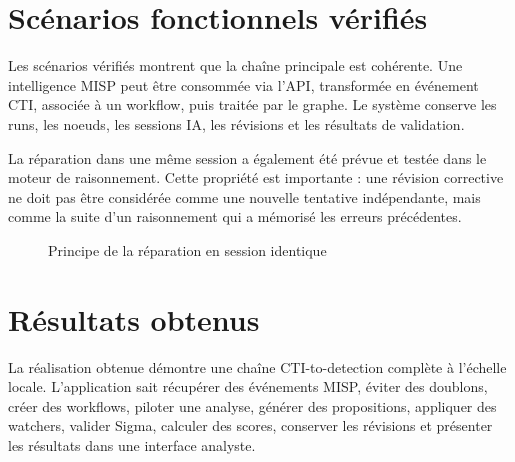 \section{Scénarios fonctionnels vérifiés}

Les scénarios vérifiés montrent que la chaîne principale est cohérente. Une intelligence MISP peut être consommée via l'API, transformée en événement CTI, associée à un workflow, puis traitée par le graphe. Le système conserve les runs, les noeuds, les sessions IA, les révisions et les résultats de validation.

La réparation dans une même session a également été prévue et testée dans le moteur de raisonnement. Cette propriété est importante : une révision corrective ne doit pas être considérée comme une nouvelle tentative indépendante, mais comme la suite d'un raisonnement qui a mémorisé les erreurs précédentes.

\begin{figure}[H]
\centering
{}
\caption{Principe de la réparation en session identique}
\label{fig:repair-session}
\end{figure}

\section{Résultats obtenus}

La réalisation obtenue démontre une chaîne CTI-to-detection complète à l'échelle locale. L'application sait récupérer des événements MISP, éviter des doublons, créer des workflows, piloter une analyse, générer des propositions, appliquer des watchers, valider Sigma, calculer des scores, conserver les révisions et présenter les résultats dans une interface analyste.

